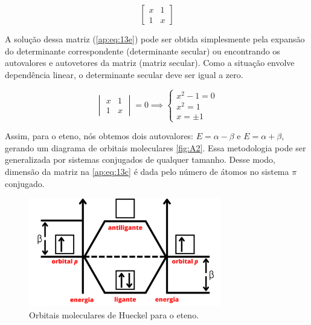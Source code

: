 \begin{equation}
\label{ap:eq:13e}
\begin{bmatrix}
    x & 1 \\
    1  & x
\end{bmatrix}
\end{equation}

A solução dessa matriz (\autoref{ap:eq:13e}) pode ser obtida simplesmente pela expansão do determinante correspondente (determinante secular) ou encontrando os autovalores e autovetores da matriz (matriz secular). Como a situação envolve dependência linear, o determinante secular deve ser igual a zero.

\begin{equation}
    \begin{vmatrix}
    x & 1 \\
    1  & x
\end{vmatrix}
= 0 \implies
\begin{cases}
 x^2 - 1 = 0 \\
 x^2 = 1 \\
 x = \pm 1
\end{cases}
\end{equation}

Assim, para o eteno, nós obtemos dois autovalores: $E = \alpha - \beta$ e $E = \alpha + \beta$, gerando um diagrama de orbitais moleculares \autoref{fig:A2}. Essa metodologia pode ser generalizada por sistemas conjugados de qualquer tamanho. Desse modo, dimensão da matriz na \autoref{ap:eq:13c} é dada pelo número de átomos no sistema $\pi$ conjugado.

\begin{figure}[htb]
	\caption{\label{fig:A2} Orbitais moleculares de Hueckel para o eteno.}
	\begin{center}
		\includegraphics[width=0.75\textwidth]{images/figA2.png}
	\end{center}
\end{figure}

